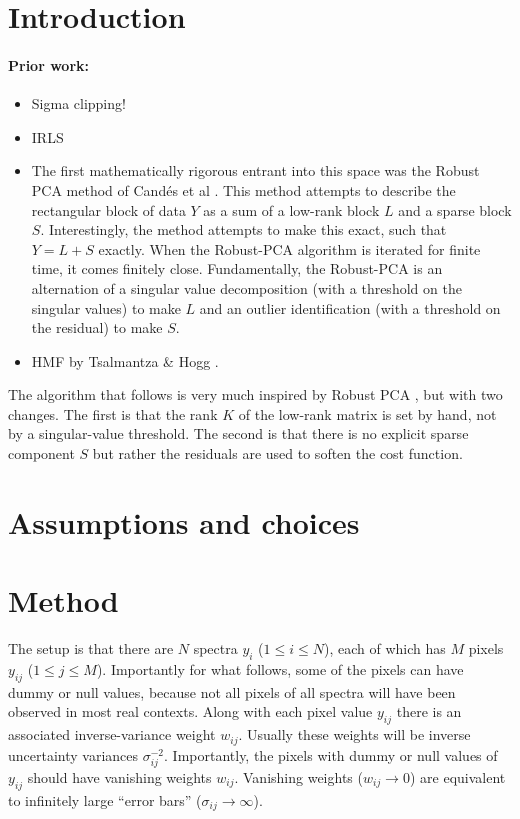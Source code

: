 \documentclass{article}
\begin{document}
\section{Introduction}

\paragraph{Prior work:}
\begin{itemize}
    \item Sigma clipping!
    \item IRLS
    \item The first mathematically rigorous entrant into this space was the Robust PCA method of Cand\'es et al \cite{candes}.
    This method attempts to describe the rectangular block of data $Y$ as a sum of a low-rank block $L$ and a sparse block $S$.
    Interestingly, the method attempts to make this exact, such that $Y=L+S$ exactly.
    When the Robust-PCA algorithm is iterated for finite time, it comes finitely close.
    Fundamentally, the Robust-PCA is an alternation of a singular value decomposition (with a threshold on the singular values) to make $L$ and an outlier identification (with a threshold on the residual) to make $S$.
    \item HMF by Tsalmantza \& Hogg \cite{hmf}.
\end{itemize}
The algorithm that follows is very much inspired by Robust PCA \cite{candes}, but with two changes.
The first is that the rank $K$ of the low-rank matrix is set by hand, not by a singular-value threshold.
The second is that there is no explicit sparse component $S$ but rather the residuals are used to soften the cost function.

\section{Assumptions and choices}

\section{Method}
The setup is that there are $N$ spectra $y_i$ ($1\leq i\leq N$),
each of which has $M$ pixels $y_{ij}$ ($1\leq j\leq M$).
Importantly for what follows, some of the pixels can have dummy or null values, because not all pixels of all spectra will have been observed in most real contexts.
Along with each pixel value $y_{ij}$ there is an associated inverse-variance weight $w_{ij}$.
Usually these weights will be inverse uncertainty variances $\sigma_{ij}^{-2}$.
Importantly, the pixels with dummy or null values of $y_{ij}$ should have vanishing weights $w_{ij}$.
Vanishing weights ($w_{ij}\rightarrow 0$) are equivalent to infinitely large ``error bars'' ($\sigma_{ij}\rightarrow\infty$).
\end{document}
